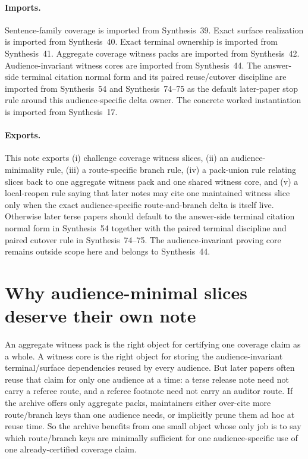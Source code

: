 \documentclass[11pt]{article}
\begin{document}
\paragraph{Imports.}
Sentence-family coverage is imported from Synthesis~39.\cite{series:challengecoverage}
Exact surface realization is imported from Synthesis~40.\cite{series:challengesurfacehooks}
Exact terminal ownership is imported from Synthesis~41.\cite{series:challengeterminalwitnesses}
Aggregate coverage witness packs are imported from Synthesis~42.\cite{series:challengecoveragewitnesspacks}
Audience-invariant witness cores are imported from Synthesis~44.\cite{series:challengecoveragewitnesscores}
The answer-side terminal citation normal form and its paired reuse/cutover discipline are imported from Synthesis~54 and Synthesis~74--75 as the default later-paper stop rule around this audience-specific delta owner.\cite{series:challengeanswerreviewmenus,series:pairedterminalcitationdiscipline,series:pairedterminalcutoverrules}
The concrete worked instantiation is imported from Synthesis~17.\cite{series:workedexample}
\paragraph{Exports.}
This note exports (i) challenge coverage witness slices, (ii) an audience-minimality rule, (iii) a route-specific branch rule, (iv) a pack-union rule relating slices back to one aggregate witness pack and one shared witness core, and (v) a local-reopen rule saying that later notes may cite one maintained witness slice only when the exact audience-specific route-and-branch delta is itself live.
Otherwise later terse papers should default to the answer-side terminal citation normal form in Synthesis~54 together with the paired terminal discipline and paired cutover rule in Synthesis~74--75. The audience-invariant proving core remains outside scope here and belongs to Synthesis~44.\cite{series:challengecoveragewitnesscores,series:challengeanswerreviewmenus,series:pairedterminalcitationdiscipline,series:pairedterminalcutoverrules}
\section{Why audience-minimal slices deserve their own note}
An aggregate witness pack is the right object for certifying one coverage claim as a whole.
A witness core is the right object for storing the audience-invariant terminal/surface dependencies reused by every audience.
But later papers often reuse that claim for only one audience at a time: a terse release note need not carry a referee route, and a referee footnote need not carry an auditor route.
If the archive offers only aggregate packs, maintainers either over-cite more route/branch keys than one audience needs, or implicitly prune them ad hoc at reuse time.
So the archive benefits from one small object whose only job is to say which route/branch keys are minimally sufficient for one audience-specific use of one already-certified coverage claim.
\end{document}
